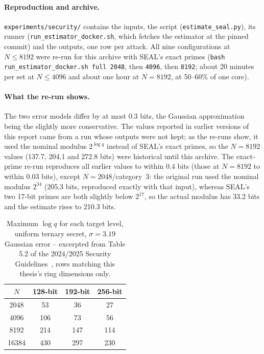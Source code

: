 \paragraph{Reproduction and archive.} \texttt{experiments/security/} contains the inputs, the script (\texttt{estimate\_seal.py}), its runner (\texttt{run\_estimator\_docker.sh}, which fetches the estimator at the pinned commit) and the outputs, one row per attack. All nine configurations at $N \le 8192$ were re-run for this archive with SEAL's exact primes (\texttt{bash run\_estimator\_docker.sh full 2048}, then \texttt{4096}, then \texttt{8192}; about 20 minutes per set at $N \le 4096$ and about one hour at $N{=}8192$, at 50--60\% of one core).

\paragraph{What the re-run shows.} The two error models differ by at most 0.3 bits, the Gaussian approximation being the slightly more conservative. The values reported in earlier versions of this report came from a run whose outputs were not kept; as the re-runs show, it used the nominal modulus $2^{\log q}$ instead of SEAL's exact primes, so the $N{=}8192$ values (137.7, 204.1 and 272.8 bits) were historical until this archive. The exact-prime re-run reproduces all earlier values to within 0.4 bits (those at $N{=}8192$ to within 0.03 bits), except $N{=}2048$/category~3: the original run used the nominal modulus $2^{34}$ (205.3 bits, reproduced exactly with that input), whereas SEAL's two 17-bit primes are both slightly below $2^{17}$, so the actual modulus has 33.2 bits and the estimate rises to 210.3 bits.

\begin{table}[h!]
\centering\small
\begin{tabular}{@{}cccc@{}}
\toprule
$N$ & 128-bit & 192-bit & 256-bit \\
\midrule
2048  & 53  & 36  & 27 \\
4096  & 106 & 73  & 56 \\
8192  & 214 & 147 & 114 \\
16384 & 430 & 297 & 230 \\
\bottomrule
\end{tabular}
\caption{Maximum $\log q$ for each target level, uniform ternary secret, $\sigma{=}3.19$ Gaussian error -- excerpted from Table 5.2 of the 2024/2025 Security Guidelines~\cite{bossuat2024}, rows matching this thesis's ring dimensions only.}
\label{tab:guideline52}
\end{table}

